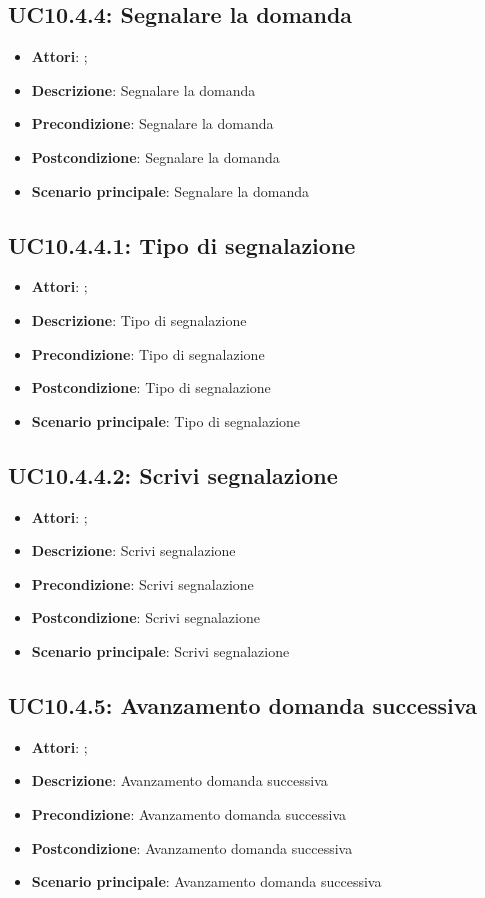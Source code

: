 \subsection{UC10.4.4: Segnalare la domanda}
\label{UC10.4.4}
\begin{itemize}
\item \textbf{Attori}: ;
\item \textbf{Descrizione}: Segnalare la domanda
\item \textbf{Precondizione}: Segnalare la domanda
\item \textbf{Postcondizione}: Segnalare la domanda
\item \textbf{Scenario principale}:
Segnalare la domanda
\end{itemize}

\subsection{UC10.4.4.1: Tipo di segnalazione}
\label{UC10.4.4.1}
\begin{itemize}
\item \textbf{Attori}: ;
\item \textbf{Descrizione}: Tipo di segnalazione
\item \textbf{Precondizione}: Tipo di segnalazione
\item \textbf{Postcondizione}: Tipo di segnalazione
\item \textbf{Scenario principale}:
Tipo di segnalazione
\end{itemize}

\subsection{UC10.4.4.2: Scrivi segnalazione}
\label{UC10.4.4.2}
\begin{itemize}
\item \textbf{Attori}: ;
\item \textbf{Descrizione}: Scrivi segnalazione
\item \textbf{Precondizione}: Scrivi segnalazione
\item \textbf{Postcondizione}: Scrivi segnalazione
\item \textbf{Scenario principale}:
Scrivi segnalazione
\end{itemize}

\subsection{UC10.4.5: Avanzamento domanda successiva}
\label{UC10.4.5}
\begin{itemize}
\item \textbf{Attori}: ;
\item \textbf{Descrizione}: Avanzamento domanda successiva
\item \textbf{Precondizione}: Avanzamento domanda successiva
\item \textbf{Postcondizione}: Avanzamento domanda successiva
\item \textbf{Scenario principale}:
Avanzamento domanda successiva
\end{itemize}

